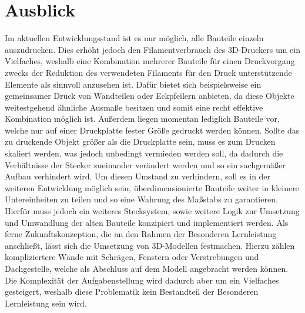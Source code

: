 \chapter{Ausblick}
Im aktuellen Entwicklungsstand ist es nur möglich, alle Bauteile einzeln auszudrucken. 
Dies erhöht jedoch den Filamentverbrauch des 3D-Druckers um ein Vielfaches, weshalb eine Kombination mehrerer Bauteile für einen Druckvorgang zwecks der Reduktion des verwendeten Filaments für den Druck unterstützende Elemente als sinnvoll anzusehen ist. 
Dafür bietet sich beispielsweise ein gemeinsamer Druck von Wandteilen oder Eckpfeilern anbieten, da diese Objekte weitestgehend ähnliche Ausmaße besitzen und somit eine recht effektive Kombination möglich ist.
Außerdem liegen momentan lediglich Bauteile vor, welche nur auf einer Druckplatte fester Größe gedruckt werden können. 
Sollte das zu druckende Objekt größer als die Druckplatte sein, muss es zum Drucken skaliert werden, was jedoch unbedingt vermieden werden soll, da dadurch die Verhältnisse der Stecker zueinander verändert werden und so ein sachgemäßer Aufbau verhindert wird. 
Um diesen Umstand zu verhindern, soll es in der weiteren Entwicklung möglich sein, überdimensionierte Bauteile weiter in kleinere Untereinheiten zu teilen und so eine Wahrung des Maßstabs zu garantieren. 
Hierfür muss jedoch ein weiteres Stecksystem, sowie weitere Logik zur Umsetzung und Umwandlung der alten Bauteile konzipiert und implementiert werden.
Als ferne Zukunftskonzeption, die an den Rahmen der Besonderen Lernleistung anschließt, lässt sich die Umsetzung von 3D-Modellen festmachen. 
Hierzu zählen kompliziertere Wände mit Schrägen, Fenstern oder Verstrebungen und Dachgestelle, welche als Abschluss auf dem Modell angebracht werden können. 
Die Komplexität der Aufgabenstellung wird dadurch aber um ein Vielfaches gesteigert, weshalb diese Problematik kein Bestandteil der Besonderen Lernleistung sein wird.

